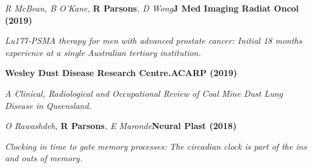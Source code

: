 \item
    \textit{R McBean, B O'Kane, }\textbf{R Parsons}\textit{, D Wong}\textbf{\hfill J Med Imaging Radiat Oncol (2019)}\par 
    \textit{Lu177‐PSMA therapy for men with advanced prostate cancer: Initial 18 months experience at a single Australian tertiary institution.}
\item
    \textbf{Wesley Dust Disease Research Centre.}\textbf{\hfill ACARP (2019)}\par 
    \textit{A Clinical, Radiological and Occupational Review of Coal Mine Dust Lung Disease in Queensland.}
\item
    \textit{O Rawashdeh, }\textbf{R Parsons}\textit{, E Maronde}\textbf{\hfill Neural Plast (2018)}\par 
    \textit{Clocking in time to gate memory processes: The circadian clock is part of the ins and outs of memory.}
